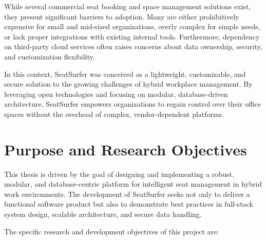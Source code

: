 \documentclass[12pt,a4paper]{report} %
\begin{document}
While several commercial seat booking and space management solutions exist, they present significant barriers to adoption. Many are either prohibitively expensive for small and mid-sized organizations, overly complex for simple needs, or lack proper integrations with existing internal tools. Furthermore, dependency on third-party cloud services often raises concerns about data ownership, security, and customization flexibility.

In this context, SeatSurfer was conceived as a lightweight, customizable, and secure solution to the growing challenges of hybrid workplace management. By leveraging open technologies and focusing on modular, database-driven architecture, SeatSurfer empowers organizations to regain control over their office spaces without the overhead of complex, vendor-dependent platforms.

\section{Purpose and Research Objectives}

This thesis is driven by the goal of designing and implementing a robust, modular, and database-centric platform for intelligent seat management in hybrid work environments. The development of SeatSurfer seeks not only to deliver a functional software product but also to demonstrate best practices in full-stack system design, scalable architecture, and secure data handling.

The specific research and development objectives of this project are:
\end{document}
